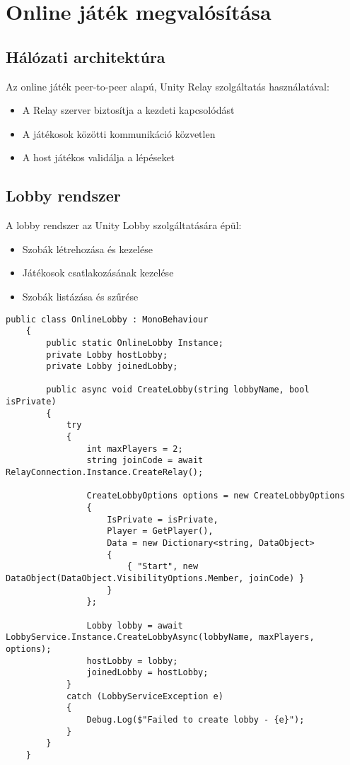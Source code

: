 \section{Online játék megvalósítása}

\subsection{Hálózati architektúra}
Az online játék peer-to-peer alapú, Unity Relay szolgáltatás használatával:
\begin{itemize}
	\item A Relay szerver biztosítja a kezdeti kapcsolódást
	\item A játékosok közötti kommunikáció közvetlen
	\item A host játékos validálja a lépéseket
\end{itemize}

\subsection{Lobby rendszer}
A lobby rendszer az Unity Lobby szolgáltatására épül:
\begin{itemize}
	\item Szobák létrehozása és kezelése
	\item Játékosok csatlakozásának kezelése
	\item Szobák listázása és szűrése
\end{itemize}

\begin{lstlisting}[language={[Sharp]C}]
	public class OnlineLobby : MonoBehaviour
	{
		public static OnlineLobby Instance;
		private Lobby hostLobby;
		private Lobby joinedLobby;
		
		public async void CreateLobby(string lobbyName, bool isPrivate)
		{
			try
			{
				int maxPlayers = 2;
				string joinCode = await RelayConnection.Instance.CreateRelay();
				
				CreateLobbyOptions options = new CreateLobbyOptions
				{
					IsPrivate = isPrivate,
					Player = GetPlayer(),
					Data = new Dictionary<string, DataObject>
					{
						{ "Start", new DataObject(DataObject.VisibilityOptions.Member, joinCode) }
					}
				};
				
				Lobby lobby = await LobbyService.Instance.CreateLobbyAsync(lobbyName, maxPlayers, options);
				hostLobby = lobby;
				joinedLobby = hostLobby;
			}
			catch (LobbyServiceException e)
			{
				Debug.Log($"Failed to create lobby - {e}");
			}
		}
	}
\end{lstlisting}

